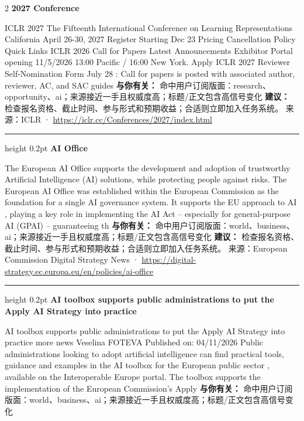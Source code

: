 \documentclass[10.5pt]{ctexart}
\begin{document}
\begin{multicols}{2}
{\large\bfseries 2027 Conference}\par
ICLR 2027 The Fifteenth International Conference on Learning Representations California April 26-30, 2027 Register Starting Dec 23 Pricing Cancellation Policy Quick Links ICLR 2026 Call for Papers Latest Announcements Exhibitor Portal opening 11/5/2026 13:00 Pacific / 16:00 New York. Apply ICLR 2027 Reviewer Self-Nomination Form July 28 : Call for papers is posted with associated author, reviewer, AC, and SAC guides 
\textbf{与你有关：} 命中用户订阅版面：research、opportunity、ai；来源接近一手且权威度高；标题/正文包含高信号变化
\textbf{建议：} 检查报名资格、截止时间、参与形式和预期收益；合适则立即加入任务系统。
{\footnotesize\color{ormuted} 来源：ICLR · \url{https://iclr.cc/Conferences/2027/index.html}}
\vspace{2mm}
\hrule height 0.2pt
\vspace{2mm}
{\large\bfseries AI Office}\par
The European AI Office supports the development and adoption of trustworthy Artificial Intelligence (AI) solutions, while protecting people against risks. The European AI Office was established within the European Commission as the foundation for a single AI governance system. It supports the EU approach to AI , playing a key role in implementing the AI Act – especially for general-purpose AI (GPAI) – guaranteeing th
\textbf{与你有关：} 命中用户订阅版面：world、business、ai；来源接近一手且权威度高；标题/正文包含高信号变化
\textbf{建议：} 检查报名资格、截止时间、参与形式和预期收益；合适则立即加入任务系统。
{\footnotesize\color{ormuted} 来源：European Commission Digital Strategy News · \url{https://digital-strategy.ec.europa.eu/en/policies/ai-office}}
\vspace{2mm}
\hrule height 0.2pt
\vspace{2mm}
{\large\bfseries AI toolbox supports public administrations to put the Apply AI Strategy into practice}\par
AI toolbox supports public administrations to put the Apply AI Strategy into practice more news Veselina FOTEVA Published on: 04/11/2026 Public administrations looking to adopt artificial intelligence can find practical tools, guidance and examples in the AI toolbox for the European public sector , available on the Interoperable Europe portal. The toolbox supports the implementation of the European Commission’s Apply
\textbf{与你有关：} 命中用户订阅版面：world、business、ai；来源接近一手且权威度高；标题/正文包含高信号变化

\end{multicols}
\end{document}
